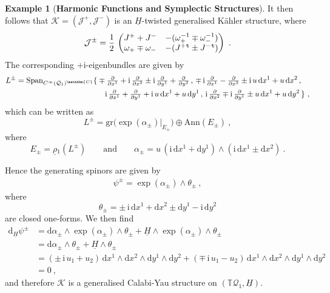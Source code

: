 \documentclass[a4paper, reqno, 11pt]{amsart}
\numberwithin{equation}{section}
\theoremstyle{definition}
\newtheorem{example}[equation]{Example}
\newcommand{\red}[1]{\underline{#1}}
\newcommand{\de}{\mathrm{d}}
\newcommand{\ii}{\mathrm{i}}
\newcommand{\IC}{\mathbbm{C}}
\newcommand{\IT}{\mathbb{T}}
\newcommand{\cQ}{{\mathcal Q}}
\newcommand{\cK}{{\mathcal K}}
\newcommand{\cJ}{{\mathcal J}}
\newcommand{\gr}{\text{gr}}
\newcommand{\ann}{\mathrm{Ann}}
\theoremstyle{remark}
\begin{document}
\begin{example}[\textbf{Harmonic Functions and Symplectic Structures}]
    It then follows that $\cK = (\cJ^+, \cJ^-)$ is an $\red H$-twisted generalised K\"ahler structure, where
    \begin{align}
        \cJ^\pm = \frac 12\,
        \begin{pmatrix}
            J^+ +J^- & -(\omega_+^{-1} \mp \omega_-^{-1})\\
            \omega_+ \mp \omega_- & -(J^+{}^{\tt t} \pm J^-{}^{\tt t})
        \end{pmatrix} \ .
    \end{align}
    The corresponding $+\ii$-eigenbundles are given by
    \begin{align}
        L^\pm = {\rm Span}_{C^\infty(\cQ_1)^\IC}\lbrace &\mp \tfrac\partial{\partial x^1} +\ii\,\tfrac\partial{\partial x^2} \pm \ii\,\tfrac\partial{\partial y^1} + \tfrac\partial{\partial y^2}\,,\,\mp \, \ii\,\tfrac\partial{\partial x^1} - \tfrac\partial{\partial x^2} \pm \ii\, u\, \de x^1 + u\, \de x^2\,,\\
        & \quad \ii\,\tfrac\partial{\partial x^1} + \tfrac\partial{\partial y^1} + \ii\, u\, \de x^1 + u\, \de y^1\,,\, \ii\, \tfrac\partial{\partial x^2} \mp \ii\, \tfrac\partial{\partial y^1} \pm u\, \de x^1 + u\,\de y^2 \, \rbrace \ ,
    \end{align}
    which can be written as $$L^\pm = \gr\big(\exp(\alpha_\pm)\big|_{E_\pm}\big) \oplus \ann(E_\pm) \ , $$ where $$E_\pm = \red\rho{}_1(L^\pm) \qquad \text{and} \qquad \alpha_\pm = u \, (\ii\,\de x^1 + \de y^1)\wedge(\ii\,\de x^1 \pm \de x^2) \ . $$ 
    
    Hence the generating spinors are given by
    \begin{align}
        \psi^\pm = \exp(\alpha_\pm) \wedge \theta_\pm \ ,
    \end{align}
    where $$\theta_\pm = \pm\,  \ii\,\de x^1 + \de x^2 \pm \de y^1 - \ii\, \de y^2 $$ are closed one-forms. We then find
    \begin{align}
        \de_{\red H} \psi^\pm &= \de\alpha_\pm\wedge \exp(\alpha_\pm) \wedge \theta_\pm + \red H\wedge \exp(\alpha_\pm) \wedge \theta_\pm\\[4pt]
        &=\de\alpha_\pm\wedge  \theta_\pm + \red H\wedge  \theta_\pm\\[4pt]
        &=(\pm\,\ii\,u_1 + u_2)\,\de x^1 \wedge \de x^2 \wedge \de y^1 \wedge \de y^2 + (\mp\,\ii\,u_1 - u_2)\,\de x^1 \wedge \de x^2 \wedge \de y^1 \wedge \de y^2\\[4pt]
        &=0 \ ,
    \end{align}
    and therefore $\cK$ is a generalised Calabi-Yau structure on $(\IT\cQ_1,\red H)$.
    

\end{example}
\end{document}
